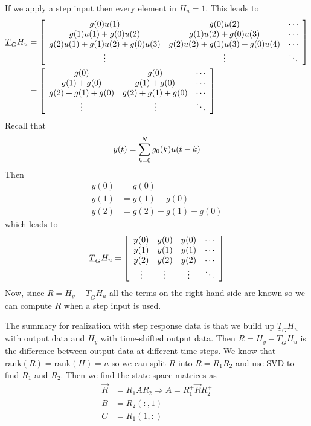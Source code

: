 If we apply a step input then every element in $H_u = 1$.
This leads to
\begin{align*}
\underline{T}_G H_u &= \left[\begin{array}{c c c}
g(0)u(1) & g(0)u(2) & \cdots \\
g(1)u(1)+g(0)u(2) & g(1)u(2)+g(0)u(3) & \cdots \\
g(2)u(1)+g(1)u(2)+g(0)u(3) & g(2)u(2)+g(1)u(3)+g(0)u(4) & \cdots \\
\vdots & \vdots & \ddots
\end{array}\right] \\
&= \left[\begin{array}{c c c}
g(0) & g(0) & \cdots \\
g(1)+g(0) & g(1)+g(0) & \cdots \\
g(2)+g(1)+g(0) & g(2)+g(1)+g(0) & \cdots \\
\vdots & \vdots & \ddots
\end{array}\right]
\end{align*}
Recall that
$$y(t)=\sum_{k=0}^N g_0(k)u(t-k)$$
Then
\begin{align*}
y(0) &= g(0) \\
y(1) &= g(1) + g(0) \\
y(2) &= g(2) + g(1) + g(0)
\end{align*}
which leads to
\begin{align*}
\underline{T}_G H_u = \left[\begin{array}{c c c c}
y(0) & y(0) & y(0) & \cdots \\
y(1) & y(1) & y(1) & \cdots \\
y(2) & y(2) & y(2) & \cdots \\
\vdots & \vdots & \vdots & \ddots
\end{array}\right]
\end{align*}
Now, since $R=H_y-\underline{T}_G H_u$ all the terms on the right hand side are known so we can compute $R$ when a step input is used.

The summary for realization with step response data is that we build up $\underline{T}_G H_u$ with output data and $H_y$ with time-shifted output data.
Then $R=H_y-\underline{T}_G H_u$ is the difference between output data at different time steps.
We know that $\text{rank}(R)=\text{rank}(H)=n$ so we can split $R$ into $R=R_1R_2$ and use SVD to find $R_1$ and $R_2$.
Then we find the state space matrices as
\begin{align*}
\vec{R} &= R_1AR_2 \Rightarrow A=R_1^+\vec{R}R_2^+ \\
B &= R_2(:,1) \\
C &= R_1(1,:)
\end{align*}

